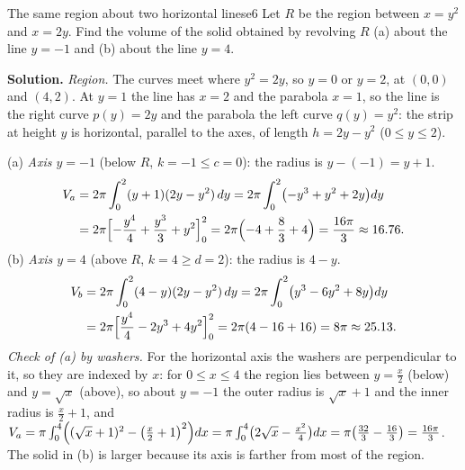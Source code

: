 \documentclass[11pt]{article}
\begin{document}
\begin{exmp}{The same region about two horizontal lines}{e6}
Let $R$ be the region between $x=y^2$ and $x=2y$. Find the volume of the solid obtained by revolving $R$ (a) about the line $y=-1$ and (b) about the line $y=4$.

\textbf{Solution.} \emph{Region.} The curves meet where $y^2=2y$, so $y=0$ or $y=2$, at $(0,0)$ and $(4,2)$. At $y=1$ the line has $x=2$ and the parabola $x=1$, so the line is the right curve $p(y)=2y$ and the parabola the left curve $q(y)=y^2$: the strip at height $y$ is horizontal, parallel to the axes, of length $h=2y-y^2$ ($0\le y\le2$).

(a) \emph{Axis $y=-1$} (below $R$, $k=-1\le c=0$): the radius is $y-(-1)=y+1$.
\[
\begin{aligned}V_a&=2\pi\int_0^2(y+1)(2y-y^2)\,dy=2\pi\int_0^2\bigl(-y^3+y^2+2y\bigr)dy\\ &=2\pi\Bigl[-\frac{y^4}4+\frac{y^3}3+y^2\Bigr]_0^2=2\pi\Bigl(-4+\frac83+4\Bigr)=\frac{16\pi}3\approx16.76 .
\end{aligned}
\]
(b) \emph{Axis $y=4$} (above $R$, $k=4\ge d=2$): the radius is $4-y$.
\[
\begin{aligned}V_b&=2\pi\int_0^2(4-y)(2y-y^2)\,dy=2\pi\int_0^2\bigl(y^3-6y^2+8y\bigr)dy\\ &=2\pi\Bigl[\frac{y^4}4-2y^3+4y^2\Bigr]_0^2=2\pi(4-16+16)=8\pi\approx25.13 .
\end{aligned}
\]
\emph{Check of (a) by washers.} For the horizontal axis the washers are perpendicular to it, so they are indexed by $x$: for $0\le x\le4$ the region lies between $y=\frac x2$ (below) and $y=\sqrt x$ (above), so about $y=-1$ the outer radius is $\sqrt x+1$ and the inner radius is $\frac x2+1$, and $V_a=\pi\int_0^4\Bigl((\sqrt x+1)^2-\bigl(\frac x2+1\bigr)^2\Bigr)dx=\pi\int_0^4\bigl(2\sqrt x-\frac{x^2}4\bigr)dx=\pi\bigl(\frac{32}3-\frac{16}3\bigr)=\frac{16\pi}3$. The solid in (b) is larger because its axis is farther from most of the region.


\end{exmp}
\end{document}
